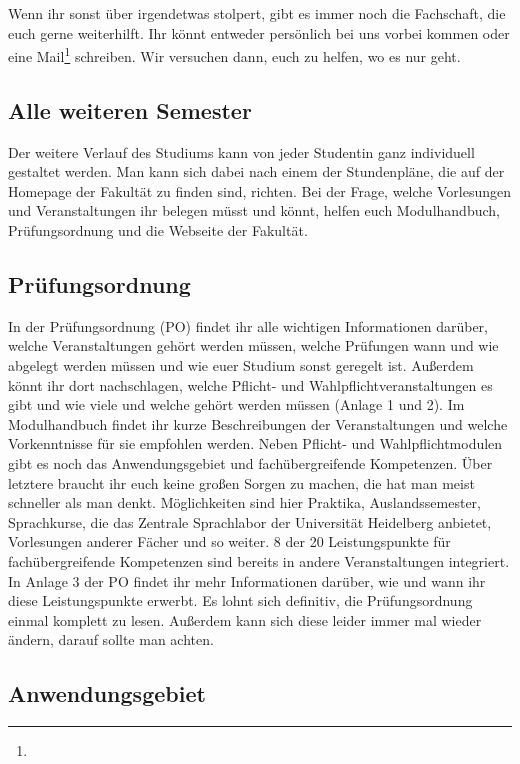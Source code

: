 Wenn ihr sonst über irgendetwas stolpert, gibt es immer noch die Fachschaft, die euch gerne weiterhilft. Ihr könnt entweder persönlich bei uns vorbei kommen oder eine Mail\footnote{} schreiben. Wir versuchen dann, euch zu helfen, wo es nur geht.

\subsection{Alle weiteren Semester}

Der weitere Verlauf des Studiums kann von jeder Studentin ganz individuell gestaltet werden. Man kann sich dabei nach einem der Stundenpläne, die auf der Homepage der Fakultät zu finden sind, richten. Bei der Frage, welche Vorlesungen und Veranstaltungen ihr belegen müsst und könnt, helfen euch Modulhandbuch, Prüfungsordnung und die Webseite der Fakultät.

\subsection{Prüfungsordnung}

In der Prüfungsordnung (\gls{PO}) findet ihr alle wichtigen Informationen darüber, welche Veranstaltungen gehört werden müssen, welche Prüfungen wann und wie abgelegt werden müssen und wie euer Studium sonst geregelt ist. Außerdem könnt ihr dort nachschlagen, welche Pflicht- und Wahlpflichtveranstaltungen es gibt und wie viele und welche gehört werden müssen (Anlage 1 und 2).  Im Modulhandbuch findet ihr kurze Beschreibungen der Veranstaltungen und welche Vorkenntnisse für sie empfohlen werden. Neben Pflicht- und Wahlpflichtmodulen gibt es noch das Anwendungsgebiet und fachübergreifende Kompetenzen. Über letztere braucht ihr euch keine großen Sorgen zu machen, die hat man meist schneller als man denkt. Möglichkeiten sind hier Praktika, Auslandssemester, Sprachkurse, die das Zentrale Sprachlabor der Universität Heidelberg anbietet, Vorlesungen anderer Fächer und so weiter. 8 der 20 Leistungspunkte für fachübergreifende Kompetenzen sind bereits in andere Veranstaltungen integriert. In Anlage 3 der PO findet ihr mehr Informationen darüber, wie und wann ihr diese Leistungspunkte erwerbt. Es lohnt sich definitiv, die Prüfungsordnung einmal komplett zu lesen. Außerdem kann sich diese leider immer mal wieder ändern, darauf sollte man achten.

\subsection{Anwendungsgebiet}

